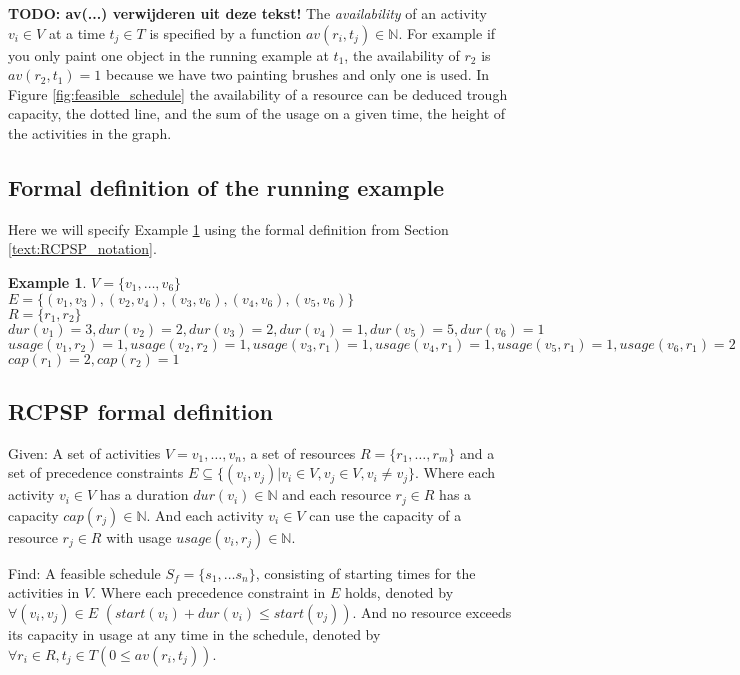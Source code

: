 \documentclass{article}
\theoremstyle{definition}
\newcommand{\TODO}[1]{{\color{red}\textbf{TODO: #1}}}
\newtheorem{example}{Example}[section]
\newcommand{\av}[2]{\ensuremath{av(r_{#1}, t_{#2})}} %
\newcommand{\capa}[1]{\ensuremath{cap(r_{#1})}} %
\newcommand{\dur}[1]{\ensuremath{dur(v_{#1})}} %
\newcommand{\usage}[2]{\ensuremath{usage(v_{#1}, r_{#2})}} %
\newcommand{\start}[1]{\ensuremath{start(v_{#1})}} %
\newenvironment{definition}[1][Definition]{\begin{trivlist}
\item[\hskip \labelsep {\bfseries #1}]}{\end{trivlist}}
\begin{document}
\TODO{av(...) verwijderen uit deze tekst!}
The \emph{availability} of an activity $v_i \in V$ at a time $t_j \in T$ is specified by a function $\av{i}{j} \in \mathbb{N}$.
For example if you only paint one object in the running example at $t_1$, the availability of $r_2$ is $\av{2}{1} = 1$ because we have two painting brushes and only one is used.
In Figure \ref{fig:feasible_schedule} the availability of a resource can be deduced trough capacity, the dotted line, and the sum of the usage on a given time, the height of the activities in the graph. 

\subsection{Formal definition of the running example}
\label{text:running_example_definition}

Here we will specify Example \ref{exmp:running} using the formal definition from Section \ref{text:RCPSP_notation}.
\begin{example}
\label{exmp:running}
$V = \{v_1, \ldots, v_6\}$\\
$E = \{(v_1, v_3), (v_2, v_4), (v_3, v_6), (v_4, v_6), (v_5, v_6)\}$\\
$R = \{r_1, r_2\}$\\
$\dur{1} = 3, \dur{2} = 2, \dur{3} = 2, \dur{4} = 1, \dur{5} = 5, \dur{6} = 1$\\
$\usage{1}{2} = 1, \usage{2}{2} = 1, \usage{3}{1} = 1, \usage{4}{1} = 1, \usage{5}{1} = 1, \usage{6}{1} = 2$\\
$\capa{1} = 2, \capa{2} = 1$
\end{example}


\subsection{RCPSP formal definition}
\label{text:RCPSP_definition}

\begin{definition}
Given:
A set of activities $V = v_1, \ldots, v_n$, a set of resources $R = \{r_1, \ldots, r_m\}$ and a set of precedence constraints $E \subseteq  \{(v_i, v_j) | v_i \in V, v_j \in V, v_i \neq v_j\}$.
Where each activity $v_i \in V$ has a duration $\dur{i} \in \mathbb{N}$ and each resource $r_j \in R$ has a capacity $\capa{j} \in \mathbb{N}$. 
And each activity $v_i \in V$ can use the capacity of a resource $r_j \in R$ with usage $\usage{i}{j} \in \mathbb{N}$.

Find:
A feasible schedule $S_f = \{s_1, \ldots s_n\}$, consisting of starting times for the activities in $V$.
Where each precedence constraint in $E$ holds, denoted by $\forall (v_i, v_j) \in E$ $(\start{i} + \dur{i} \leq \start{j})$.
And no resource exceeds its capacity in usage at any time in the schedule, denoted by $\forall r_i \in R, t_j \in T (0 \leq \av{i}{j})$.
\end{definition}
\end{document}
